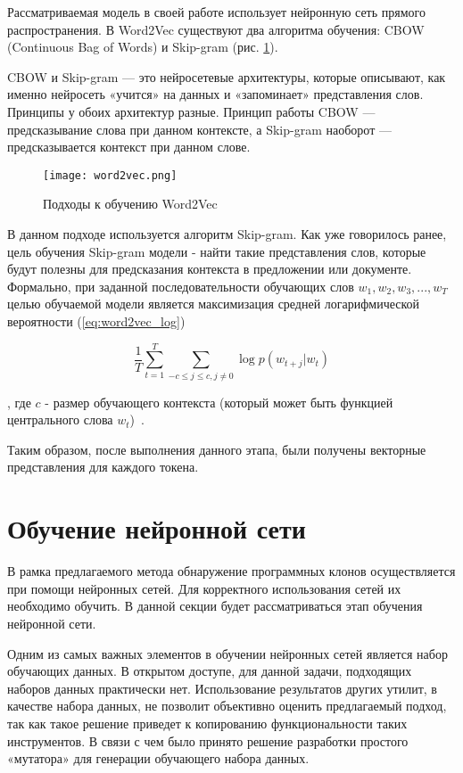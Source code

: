 Рассматриваемая модель в своей работе использует нейронную сеть прямого распространения. В Word2Vec существуют два алгоритма обучения: CBOW (Continuous Bag of Words) и Skip-gram (рис. \ref{fig:word2vec}).


CBOW и Skip-gram — это нейросетевые архитектуры, которые описывают, как именно нейросеть «учится» на данных и «запоминает» представления слов. Принципы у обоих архитектур разные. Принцип работы CBOW — предсказывание слова при данном контексте, а Skip-gram наоборот — предсказывается контекст при данном слове.

\begin{figure}[htbp]
\centering
\texttt{[image: word2vec.png]}
\caption{Подходы к обучению Word2Vec}
\label{fig:word2vec}
\end{figure}

В данном подходе используется алгоритм Skip-gram. Как уже говорилось ранее, цель обучения Skip-gram модели - найти такие представления слов, которые будут полезны для предсказания контекста в предложении или документе. Формально, при заданной последовательности обучающих слов \(w_1, w_2, w_3,...,w_T\) целью обучаемой модели является максимизация средней логарифмической вероятности (\ref{eq:word2vec_log})

\begin{equation}
\label{eq:word2vec_log}
\frac{1}{T}\sum_{t=1}^{T}\sum_{-c \leq j \leq c,j\neq0}\log p(w_{t+j}|w_t)
\end{equation}

, где \(c\) - размер обучающего контекста (который может быть функцией центрального слова \(w_t\))~\cite{word2vec}.

Таким образом, после выполнения данного этапа, были получены векторные представления для каждого токена.
\section{Обучение нейронной сети}

В рамка предлагаемого метода обнаружение программных клонов осуществляется при помощи нейронных сетей. Для корректного использования сетей их необходимо обучить. В данной секции будет рассматриваться этап обучения нейронной сети.

Одним из самых важных элементов в обучении нейронных сетей является набор обучающих данных. В открытом доступе, для данной задачи, подходящих наборов данных практически нет. Использование результатов других утилит, в качестве набора данных, не позволит объективно оценить предлагаемый подход, так как такое решение приведет к копированию функциональности таких инструментов. В связи с чем было принято решение разработки простого «мутатора» для генерации обучающего набора данных.

